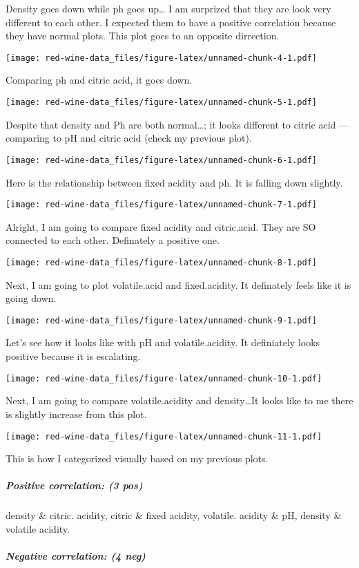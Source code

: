 \documentclass[]{article}
\let\oldsubparagraph\subparagraph
\renewcommand{\subparagraph}[1]{\oldsubparagraph{#1}\mbox{}}
\begin{document}
Density goes down while ph goes up\ldots{} I am surprized that they are
look very different to each other. I expected them to have a positive
correlation because they have normal plots. This plot goes to an
opposite dirrection.

\texttt{[image: red-wine-data\_files/figure-latex/unnamed-chunk-4-1.pdf]}

Comparing ph and citric acid, it goes down.

\texttt{[image: red-wine-data\_files/figure-latex/unnamed-chunk-5-1.pdf]}

Despite that density and Ph are both normal\ldots{}; it looks different
to citric acid ---comparing to pH and citric acid (check my previous
plot).

\texttt{[image: red-wine-data\_files/figure-latex/unnamed-chunk-6-1.pdf]}

Here is the relationship between fixed acidity and ph. It is falling
down slightly.

\texttt{[image: red-wine-data\_files/figure-latex/unnamed-chunk-7-1.pdf]}

Alright, I am going to compare fixed acidity and citric.acid. They are
SO connected to each other. Definately a positive one.

\texttt{[image: red-wine-data\_files/figure-latex/unnamed-chunk-8-1.pdf]}

Next, I am going to plot volatile.acid and fixed.acidity. It definately
feels like it is going down.

\texttt{[image: red-wine-data\_files/figure-latex/unnamed-chunk-9-1.pdf]}

Let's see how it looks like with pH and volatile.acidity. It definiately
looks positive because it is escalating.

\texttt{[image: red-wine-data\_files/figure-latex/unnamed-chunk-10-1.pdf]}

Next, I am going to compare volatile.acidity and density\ldots{}It looks
like to me there is slightly increase from this plot.

\texttt{[image: red-wine-data\_files/figure-latex/unnamed-chunk-11-1.pdf]}

This is how I categorized visually based on my previous plots.

\subparagraph{Positive correlation: (3
pos)}\label{positive-correlation-3-pos}

density \& citric. acidity, citric \& fixed acidity, volatile. acidity
\& pH, density \& volatile acidity.

\subparagraph{Negative correlation: (4
neg)}\label{negative-correlation-4-neg}
\end{document}
